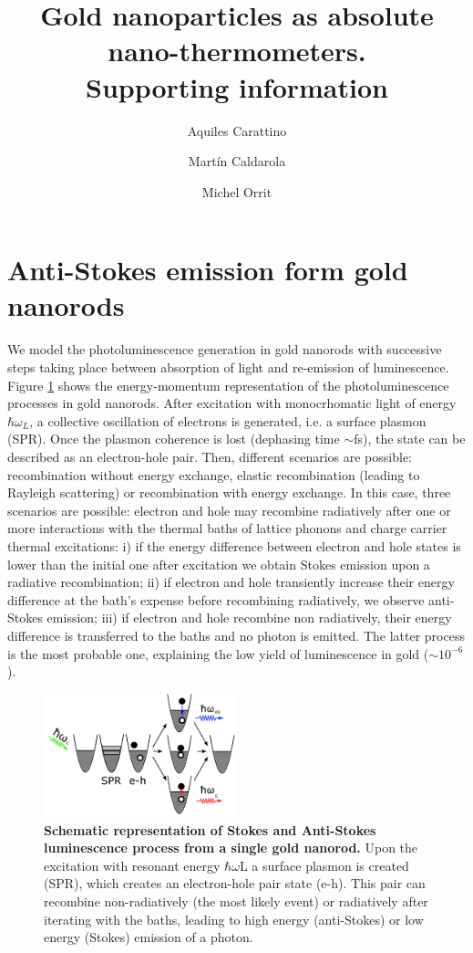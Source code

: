 \documentclass[journal=nalefd,manuscript=letter]{achemso}
\author{Aquiles Carattino}
\affiliation[Leiden]
{Huygens-Kamerlingh Onnes Lab, 2300RA Leiden, The Netherlands}
\author{Mart\'in Caldarola}
\affiliation[Leiden]
{Huygens-Kamerlingh Onnes Lab, 2300RA Leiden, The Netherlands}
\author{Michel Orrit}
\affiliation[Leiden]
{Huygens-Kamerlingh Onnes Lab, 2300RA Leiden, The Netherlands}
\title{Gold nanoparticles as absolute nano-thermometers. \\
Supporting information}
\begin{document}
\maketitle



\section{Anti-Stokes emission form gold nanorods}\label{sec:AS}

We model the photoluminescence generation in gold nanorods with successive 
steps taking place between absorption of light and re-emission of luminescence\cite{Carattino2016a}. 
Figure \ref{fig:anti-Stokes-process} shows the energy-momentum representation
of the photoluminescence processes in gold nanorods. 
After excitation with monocrhomatic light of energy $\hbar \omega_L$, 
a collective oscillation of electrons is generated, i.e. a surface plasmon (SPR). 
Once the plasmon coherence is lost (dephasing time $\sim$fs), the state can be described as an
electron-hole pair. Then, different scenarios are possible: recombination 
without energy exchange, elastic recombination (leading to Rayleigh scattering) or 
recombination with energy exchange. In this case, three scenarios are possible: electron and hole may
recombine radiatively after one or more interactions with the thermal baths of
lattice phonons and charge carrier thermal excitations: i) if the energy
difference between electron and hole states is lower than the initial one after
excitation we obtain Stokes emission upon a radiative recombination; ii) if
electron and hole transiently increase their energy difference at the bath's
expense before recombining radiatively, we observe anti-Stokes emission; iii) if
electron and hole recombine non radiatively, their energy difference is
transferred to the baths and no photon is emitted. The latter process is the
most probable one, explaining the low yield of luminescence in gold ($\sim 10^{-6}$). 

\begin{figure}[htp] \centering
\includegraphics[width=0.5\textwidth]{Figures/Supplementary/01_AS_Scheme/luminescence_all_AS.png}
\caption{\textbf{Schematic representation of Stokes and Anti-Stokes luminescence process from a single gold nanorod.} 
Upon the excitation with resonant energy $\hbar \omega\textrm{L}$ a surface plasmon is created (SPR), which creates 
an electron-hole pair state (e-h). This pair can recombine non-radiatively (the most likely event) or radiatively
after iterating with the baths, leading to high energy (anti-Stokes) or low energy (Stokes) emission of a photon.}
	\label{fig:anti-Stokes-process}
\end{figure}
\end{document}
